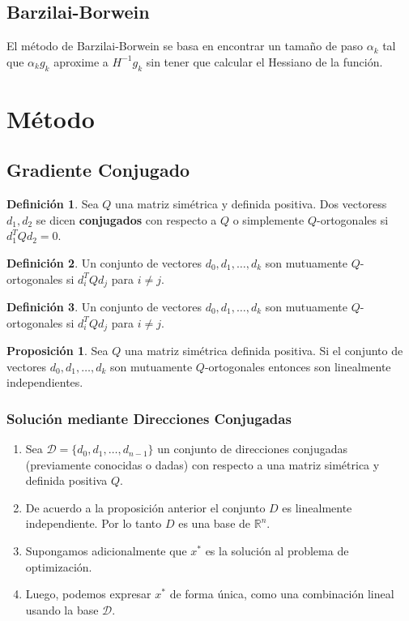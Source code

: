 \documentclass[11pt,letterpaper]{article}
\theoremstyle{definition}
\newtheorem{defi}{Definición}[section]%
\theoremstyle{definition}
\newtheorem{prop}{Proposición}
\theoremstyle{definition}
\begin{document}
\subsection{Barzilai-Borwein}
El método de Barzilai-Borwein se basa en encontrar un tamaño de paso $ \alpha_k $ tal que $ \alpha_k g_k $ aproxime a $ H^{-1} g_k $ sin tener que calcular el Hessiano de la función. 

\section{Método}
\subsection{Gradiente Conjugado}
\begin{shaded*}
	\begin{defi}
		Sea $ Q $ una matriz simétrica y definida positiva. Dos vectoress $ d_1 , d_2 $ se dicen \textbf{conjugados} con respecto a $ Q $ o simplemente $ Q $-ortogonales si $ d_1^T Q d_2 = 0 $. 
	\end{defi}

	\begin{defi}
		Un conjunto de vectores $ d_0, d_1, \dots, d_k $ son mutuamente $ Q $-ortogonales si $ d_i^T Q d_j $ para $ i \neq j $.
	\end{defi}
\end{shaded*}

\begin{shaded*}
	\begin{defi}
		Un conjunto de vectores $ d_0, d_1, \dots, d_k $ son mutuamente $ Q $-ortogonales si $ d_i^T Q d_j $ para $ i \neq j $.
	\end{defi}
\end{shaded*}

\begin{shaded*}
	\begin{prop}
		Sea $ Q $ una matriz simétrica definida positiva. Si el conjunto de vectores $ d_0, d_1, \dots, d_k $ son mutuamente $ Q $-ortogonales entonces son linealmente independientes.
	\end{prop}
\end{shaded*}

\subsubsection{Solución mediante Direcciones Conjugadas}
\begin{enumerate}
	\item Sea $ \mathcal{D} = \{ d_0, d_1, \dots, d_{n-1} \} $ un conjunto de direcciones conjugadas (previamente conocidas o dadas) con respecto a una matriz simétrica y definida positiva $ Q $.
	\item De acuerdo a la proposición anterior el conjunto $ D $ es linealmente independiente. Por lo tanto $ D $ es una base de $ \mathbb{R}^n $.
	\item Supongamos adicionalmente que $ x^* $ es la solución al problema de optimización.
	\item Luego, podemos expresar $ x^* $ de forma única, como una combinación lineal usando la base $ \mathcal{D} $.
\end{enumerate}
\end{document}
